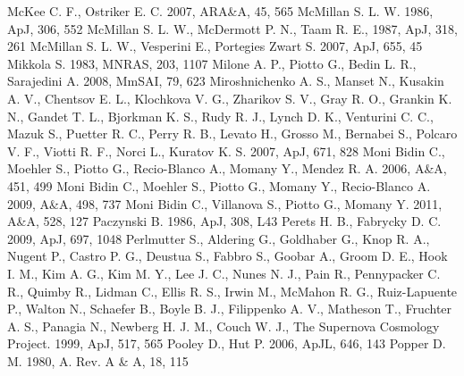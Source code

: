 \begin{thebibliography}{99}
  McKee C. F., Ostriker E. C. 2007, ARA\&A, 45, 565
  McMillan S. L. W. 1986, ApJ, 306, 552
  McMillan S. L. W., McDermott P. N., Taam R. E., 1987, ApJ, 318,
  261
 McMillan S. L. W., Vesperini E.,
  Portegies Zwart S. 2007, ApJ, 655, 45
 Mikkola
  S. 1983, MNRAS, 203, 1107
 Milone A. P., Piotto G., Bedin L. R.,
  Sarajedini A. 2008, MmSAI, 79, 623
 Miroshnichenko A. S., Manset N.,
  Kusakin A. V., Chentsov E. L., Klochkova V. G., Zharikov S. V., Gray
  R. O., Grankin K. N., Gandet T. L., Bjorkman K. S., Rudy R. J.,
  Lynch D. K., Venturini C. C., Mazuk S., Puetter R. C., Perry R. B.,
  Levato H., Grosso M., Bernabei S., Polcaro V. F., Viotti R. F.,
  Norci L., Kuratov K. S. 2007, ApJ, 671, 828
 Moni Bidin C., Moehler S., Piotto G.,
  Recio-Blanco A., Momany Y., Mendez R. A. 2006, A\&A, 451, 499 
 Moni Bidin C., Moehler S., Piotto G.,
  Momany Y., Recio-Blanco A. 2009, A\&A, 498, 737
 Moni Bidin C., Villanova S., Piotto G.,
  Momany Y. 2011, A\&A, 528, 127
  Paczynski B. 1986, ApJ, 308, L43
  Perets H. B., Fabrycky D. C. 2009, ApJ, 697, 1048
 Perlmutter S., Aldering G., Goldhaber
  G., Knop R. A., Nugent P., Castro P. G., Deustua S., Fabbro S.,
  Goobar A., Groom D. E., Hook I. M., Kim A. G., Kim M. Y., Lee J. C.,
  Nunes N. J., Pain R., Pennypacker C. R., Quimby R., Lidman C., Ellis
  R. S., Irwin M., McMahon R. G., Ruiz-Lapuente P., Walton N.,
  Schaefer B., Boyle B. J., Filippenko A. V., Matheson T., Fruchter
  A. S., Panagia N., Newberg H. J. M., Couch W. J., The Supernova
  Cosmology Project. 1999, ApJ, 517, 565
  Pooley D., Hut P. 2006, ApJL, 646, 143
 Popper
  D. M. 1980, A. Rev. A \& A, 18, 115

\end{thebibliography}
